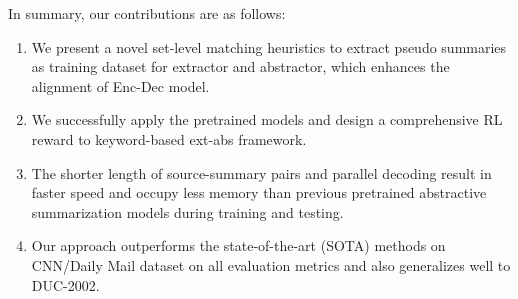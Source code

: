 
In summary, our contributions are as follows:
\begin{enumerate}
\item We present a novel set-level matching heuristics 
to extract pseudo summaries as training dataset for extractor and abstractor,
which enhances the alignment of Enc-Dec model.
\item We successfully apply the pretrained models and 
design a comprehensive RL reward to keyword-based ext-abs framework.
\item The shorter length of source-summary pairs and parallel decoding result in faster speed and occupy less memory than previous pretrained abstractive summarization models during training and testing.
\item Our approach outperforms the state-of-the-art (SOTA) methods on CNN/Daily Mail 
dataset on all evaluation metrics and also generalizes well to DUC-2002.
\end{enumerate}
